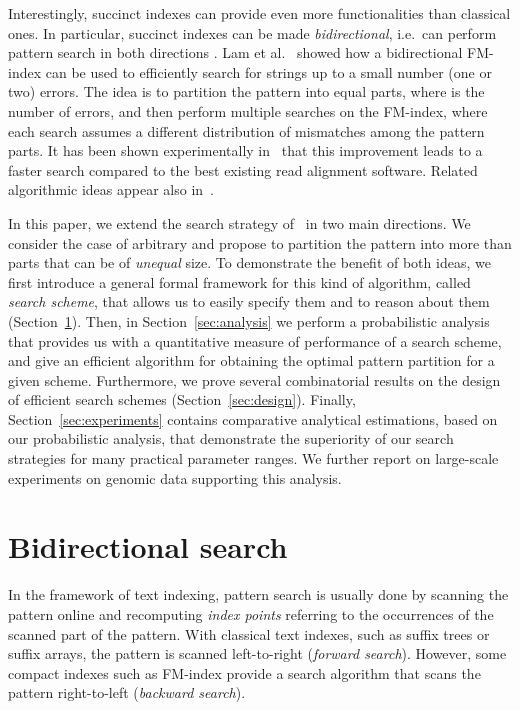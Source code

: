 \documentclass[12pt]{article}
\begin{document}
Interestingly, succinct indexes can provide even more functionalities
than classical ones. In particular, succinct indexes can be
made \emph{bidirectional}, i.e.\ can perform pattern search in both
directions \cite{LamLTWWY09,RussoEtAlAlgorithms09,SchnattingerOG12,BelazzouguiCKM13}.
Lam et al.~\cite{LamLTWWY09} showed how a
bidirectional FM-index can be used to efficiently search for strings
up to a small number (one or two) errors. The idea is to partition the pattern into 
equal parts, where  is the number of errors,
and then perform multiple searches on the FM-index, where
each search assumes a different distribution of mismatches among the
pattern parts. It has been shown experimentally
in~\cite{LamLTWWY09} that this improvement leads to a
faster search compared to the best existing read alignment
software.
Related algorithmic ideas appear also in~\cite{RussoEtAlAlgorithms09}.

In this paper, we extend the search strategy of~\cite{LamLTWWY09} 
in two
main directions. We consider the case of arbitrary  and propose to
partition the pattern into more than  parts that can be of
\emph{unequal} size. To demonstrate the benefit of both ideas, we first introduce a general formal framework for this
kind of algorithm, called \emph{search scheme}, that allows us to easily specify them and to
reason about them (Section~\ref{sec:bidirectional}). 
Then, in Section~\ref{sec:analysis} we perform a probabilistic analysis
that provides us with a quantitative measure of performance of a search
scheme, and give an efficient algorithm for obtaining the optimal
pattern partition for a given scheme.
Furthermore, we prove
several combinatorial results on the design of efficient search
schemes (Section~\ref{sec:design}).
Finally, Section~\ref{sec:experiments} contains comparative analytical
estimations, based on our probabilistic analysis, that demonstrate the
superiority of our search strategies for many practical parameter
ranges. 
We further report on large-scale experiments on genomic data
supporting this analysis. 

\section{Bidirectional search}\label{sec:bidirectional}

In the framework of text indexing, pattern search is usually done by
scanning the pattern online and recomputing \emph{index points}
referring to the occurrences of the scanned part of the pattern. 
With classical text indexes, such as suffix trees or
suffix arrays, the pattern is scanned left-to-right (\emph{forward
search}). However, some compact indexes such as FM-index provide a
search algorithm that scans the pattern right-to-left (\emph{backward
search}). 
\end{document}
